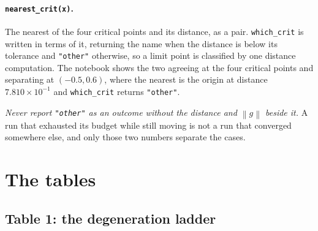 \documentclass[11pt,a4paper]{article}
\providecommand{\norm}[1]{\left \lVert #1 \right \rVert}
\theoremstyle{remark}
\begin{document}
\paragraph{\texttt{nearest\_crit(x)}.}
The nearest of the four critical points and its distance, as a pair.
\texttt{which\_crit} is written in terms of it, returning the name when the
distance is below its tolerance and \texttt{"other"} otherwise, so a limit point
is classified by one distance computation. The notebook shows the two agreeing at
the four critical points and separating at $(-0.5, 0.6)$, where the nearest is
the origin at distance $7.810\times10^{-1}$ and \texttt{which\_crit} returns
\texttt{"other"}.

\emph{Never report \texttt{"other"} as an outcome without the distance and
$\norm{g}$ beside it.} A run that exhausted its budget while still moving is not
a run that converged somewhere else, and only those two numbers separate the
cases.

\section{The tables}\label{sec: tables}

\subsection{Table 1: the degeneration ladder}\label{sec: table one}
\end{document}
